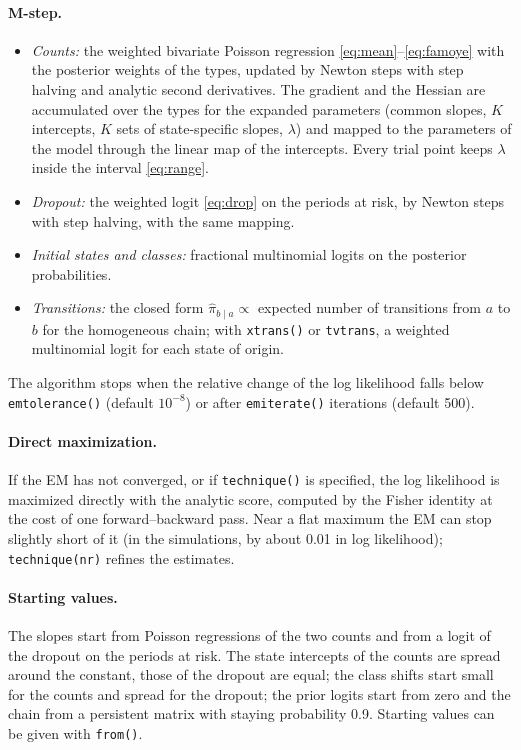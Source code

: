 \documentclass[11pt,a4paper]{article}
\newcommand{\cmd}[1]{\texttt{#1}}
\begin{document}
\paragraph{M-step.}
\begin{itemize}
\item \emph{Counts:} the weighted bivariate Poisson regression \eqref{eq:mean}--\eqref{eq:famoye} with
the posterior weights of the types, updated by Newton steps with step halving and analytic second
derivatives. The gradient and the Hessian are accumulated over the types for the expanded parameters
(common slopes, $K$ intercepts, $K$ sets of state-specific slopes, $\lambda$) and mapped to the
parameters of the model through the linear map of the intercepts. Every trial point keeps $\lambda$
inside the interval \eqref{eq:range}.
\item \emph{Dropout:} the weighted logit \eqref{eq:drop} on the periods at risk, by Newton steps with step
halving, with the same mapping.
\item \emph{Initial states and classes:} fractional multinomial logits on the posterior probabilities.
\item \emph{Transitions:} the closed form $\hat\pi_{b\mid a}\propto$ expected number of transitions from
$a$ to $b$ for the homogeneous chain; with \cmd{xtrans()} or \cmd{tvtrans}, a weighted multinomial logit
for each state of origin.
\end{itemize}
The algorithm stops when the relative change of the log likelihood falls below \cmd{emtolerance()}
(default $10^{-8}$) or after \cmd{emiterate()} iterations (default 500).

\paragraph{Direct maximization.} If the EM has not converged, or if \cmd{technique()} is specified, the
log likelihood is maximized directly with the analytic score, computed by the Fisher identity at the
cost of one forward--backward pass. Near a flat maximum the EM can stop slightly short of it (in the
simulations, by about 0.01 in log likelihood); \cmd{technique(nr)} refines the estimates.

\paragraph{Starting values.} The slopes start from Poisson regressions of the two counts and from a logit
of the dropout on the periods at risk. The state intercepts of the counts are spread around the
constant, those of the dropout are equal; the class shifts start small for the counts and spread for
the dropout; the prior logits start from zero and the chain from a persistent matrix with staying
probability 0.9. Starting values can be given with \cmd{from()}.
\end{document}
